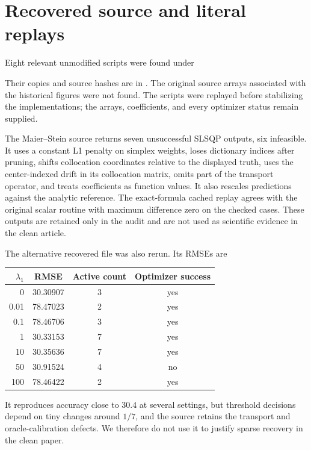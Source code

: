 \documentclass[11pt,a4paper]{article}
\begin{document}
\clearpage
\section*{Recovered source and literal replays}
Eight relevant unmodified scripts were found under
\begin{quote}\end{quote}
Their copies and source hashes are in . The original source arrays associated with the historical figures were not found. The scripts were replayed before stabilizing the implementations; the arrays, coefficients, and every optimizer status remain supplied.

The Maier--Stein source  returns seven unsuccessful SLSQP outputs, six infeasible. It uses a constant L1 penalty on simplex weights, loses dictionary indices after pruning, shifts collocation coordinates relative to the displayed truth, uses the center-indexed drift in its collocation matrix, omits part of the transport operator, and treats coefficients as function values. It also rescales predictions against the analytic reference. The exact-formula cached replay agrees with the original scalar routine with maximum difference zero on the checked cases. These outputs are retained only in the audit and are not used as scientific evidence in the clean article.

The alternative recovered file  was also rerun. Its RMSEs are
\begin{center}\small\begin{tabular}{rccc}\toprule
$\lambda_1$ & RMSE & Active count & Optimizer success\\\midrule
0 & 30.30907 & 3 & yes \\
0.01 & 78.47023 & 2 & yes \\
0.1 & 78.46706 & 3 & yes \\
1 & 30.33153 & 7 & yes \\
10 & 30.35636 & 7 & yes \\
50 & 30.91524 & 4 & no \\
100 & 78.46422 & 2 & yes \\
\bottomrule\end{tabular}\end{center}
It reproduces accuracy close to $30.4$ at several settings, but threshold decisions depend on tiny changes around $1/7$, and the source retains the transport and oracle-calibration defects. We therefore do not use it to justify sparse recovery in the clean paper.
\end{document}
